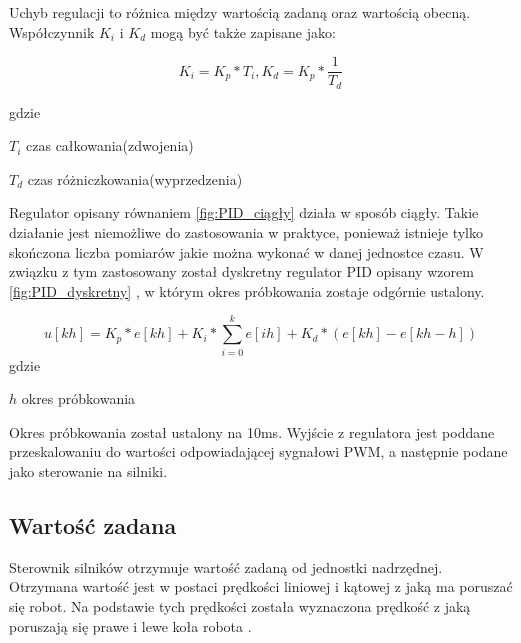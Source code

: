 Uchyb regulacji to różnica między wartością zadaną oraz wartością obecną. 
Współczynnik $K_i$ i $K_d$ mogą być także zapisane jako:

\begin{equation}
K_i = K_p * T_i,   K_d = K_p * \frac{1}{T_d}
\label{fig:pid_wzmocnienia}
\end{equation}

gdzie
\begin{eqwhere}[2cm]
	\item[$T_i$] czas całkowania(zdwojenia)  
	\item[$T_d$] czas różniczkowania(wyprzedzenia)  
\end{eqwhere}

Regulator opisany równaniem \ref{fig:PID_ciągły} działa w sposób ciągły. Takie działanie jest niemożliwe do zastosowania w praktyce, ponieważ istnieje tylko skończona liczba pomiarów jakie można wykonać w danej jednostce czasu. W związku z tym zastosowany został dyskretny regulator PID opisany wzorem \ref{fig:PID_dyskretny} \cite{pid_discrete}, w którym okres próbkowania zostaje odgórnie ustalony.

\begin{equation}
u[kh] = K_p*e[kh] + K_i*\sum_{i=0}^{k}e[ih] +K_d*(e[kh]-e[kh-h])
\label{fig:PID_dyskretny}
\end{equation}
gdzie
\begin{eqwhere}[2cm]
	\item[$h$]  okres próbkowania	 
\end{eqwhere}

Okres próbkowania  został ustalony na 10ms. Wyjście z regulatora jest poddane przeskalowaniu do wartości odpowiadającej sygnałowi PWM, a następnie podane jako sterowanie na silniki.


\subsection{Wartość zadana}

Sterownik silników otrzymuje wartość zadaną  od jednostki nadrzędnej. Otrzymana wartość jest w postaci prędkości liniowej i kątowej z jaką ma poruszać się robot. Na podstawie tych prędkości została wyznaczona prędkość z jaką poruszają się prawe i lewe koła robota \cite{wheels_vel}. 

